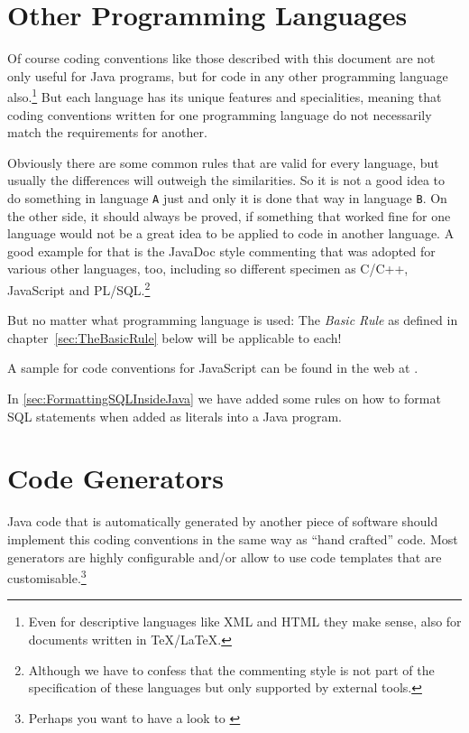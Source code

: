 \documentclass[12pt,a4paper,titlepage, parskip=half, headsepline, footsepline, cleardoubleplain]{scrbook}
\begin{document}
\section{Other Programming Languages}\label{sec:OtherProgrammingLanguages}
Of course coding conventions like those described with this document are not only useful for Java programs, but for code in any other programming language also.\footnote{Even for descriptive languages like XML and HTML they make sense, also for documents written in TeX/LaTeX.} But each language has its unique features and specialities, meaning that coding conventions written for one programming language do not necessarily match the requirements for another.

Obviously there are some common rules that are valid for every language, but usually the differences will outweigh the similarities. So it is not a good idea to do something in language \verb#A# just and only it is done that way in language \verb#B#. On the other side, it should always be proved, if something that worked fine for one language would not be a great idea to be applied to code in another language. A good example for that is the JavaDoc style commenting that was adopted for various other languages, too, including so different specimen as C/C++, JavaScript and PL/SQL.\footnote{Although we have to confess that the commenting style is not part of the specification of these languages but only supported by external tools.}

But no matter what programming language is used: The \textit{Basic Rule} as defined in chapter~\ref{sec:TheBasicRule} below will be applicable to each!

A sample for code conventions for JavaScript can be found in the web at \autocite{JAVASCRIPT_CODE_CONVENTIONS}.

In \vref{sec:FormattingSQLInsideJava} we have added some rules on how to format SQL statements when added as literals into a Java program.

\section{Code Generators}
Java code that is automatically generated by another piece of software should implement this coding conventions in the same way as “hand crafted” code. Most generators are highly configurable and/or allow to use code templates that are customisable.\footnote{Perhaps you want to have a look to \autocite{TQUADRAT_ORG_FOUNDATION_JAVACOMPOSER}}
\end{document}
